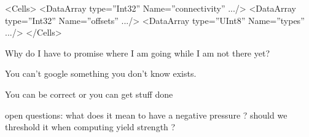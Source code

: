  <Cells>
      <DataArray type=”Int32” Name=”connectivity” .../>
      <DataArray type=”Int32” Name=”offsets” .../>
      <DataArray type=”UInt8” Name=”types” .../>
    </Cells>


Why do I have to promise where I am going while I am not there yet?

You can't google something you don't know exists.

You can be correct or you can get stuff done

open questions:
what does it mean to have a negative pressure ? should we threshold it when computing yield strength ? 
